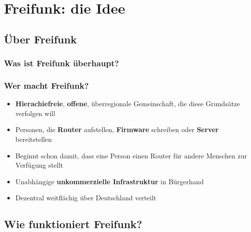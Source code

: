 \section{Freifunk: die Idee}
\subsection{Über Freifunk}

\begin{frame}
\frametitle{Was ist Freifunk überhaupt?}
\end{frame}

\begin{frame}
\frametitle{Wer macht Freifunk?}
\begin{itemize}
\item \textbf{Hierachiefreie}, \textbf{offene}, überregionale Gemeinschaft, die diese Grundsätze verfolgen will
\item Personen, die \textbf{Router} aufstellen, \textbf{Firmware} schreiben oder \textbf{Server} bereitstellen
\item Beginnt schon damit, dass eine Person einen Router für andere Menschen zur Verfügung stellt
\item Unabhängige \textbf{unkommerzielle Infrastruktur} in Bürgerhand
\item Dezentral weitflächig über Deutschland verteilt
\end{itemize}
\end{frame}

\subsection{Wie funktioniert Freifunk?}

